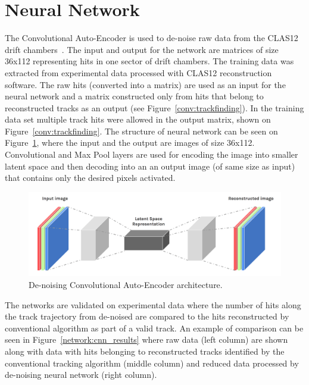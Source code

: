 \section{Neural Network}

The Convolutional Auto-Encoder is used to de-noise raw data from the CLAS12 drift chambers~\cite{Thomadakis:2022zcd}. 
The input and output for the network are matrices of size 36x112 representing hits in one sector of drift chambers. 
The training data was extracted from experimental data processed with CLAS12 reconstruction software. 
The raw hits (converted into a matrix) are used as an input for the neural network and a matrix constructed 
only from hits that belong to reconstructed tracks as an output (see Figure~\ref{conv:trackfinding}). 
In the training data set multiple track hits were allowed in the output matrix, shown on Figure~\ref{conv:trackfinding}.
The structure of neural network can be seen on Figure~\ref{network:cnn_encoder}, where the input and the output are images
of size 36x112. Convolutional and Max Pool layers are used for encoding the image into smaller latent space and then
decoding into an an output image (of same size as input) that contains only the desired pixels activated.

\begin{figure}[!h]
\begin{center}
 \includegraphics[width=5.1in]{images/convolutional-autoencoder.png}
\caption {De-noising Convolutional Auto-Encoder architecture. }
 \label{network:cnn_encoder}
 \end{center}
\end{figure}

The networks are validated on experimental data where the number of hits along the 
track trajectory from de-noised are compared to the hits reconstructed by conventional algorithm
as part of a valid track. An example of comparison can be seen in Figure~\ref{network:cnn_results} 
where raw data (left column) are shown along with data with hits belonging to reconstructed tracks 
identified by the conventional tracking algorithm (middle column) and 
reduced data processed by de-noising neural network (right column).

